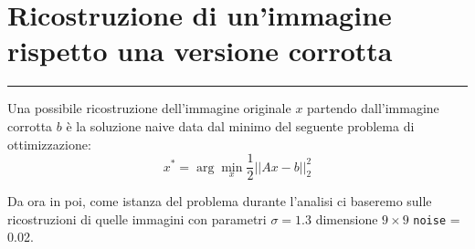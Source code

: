 {\color{oorange}\section{Ricostruzione di un'immagine rispetto una versione corrotta}}
\textcolor{oorange}{\rule[5pt]{\textwidth}{1pt}}
Una possibile ricostruzione dell'immagine originale $x$ partendo dall'immagine corrotta $b$ è la soluzione naive 
data dal minimo del seguente problema di ottimizzazione:
\[x^* = \arg\min_x \frac{1}{2} ||Ax - b||_2^2\]

Da ora in poi, come istanza del problema durante l'analisi ci baseremo sulle ricostruzioni di
 quelle immagini con parametri
$\sigma = 1.3$ dimensione $9\times 9$ \verb|noise| = 0.02.

